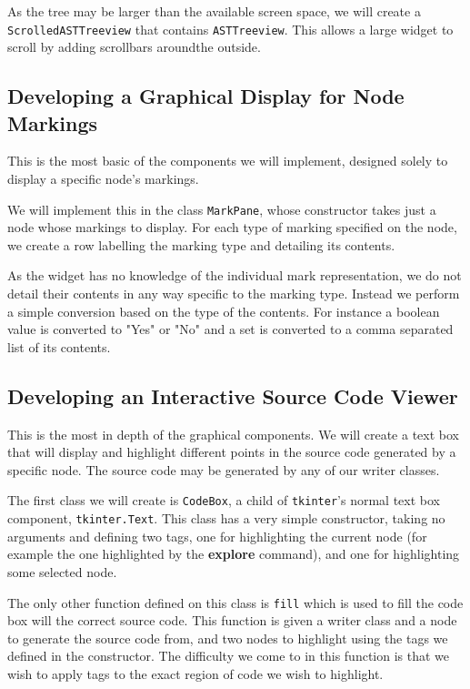 \documentclass[twoside,a4paper]{report}
\begin{document}
As the tree may be larger than the available screen space, we will create a \texttt{ScrolledASTTreeview} that contains \texttt{ASTTreeview}. This allows a
large widget to scroll by adding scrollbars aroundthe outside.

\subsection{Developing a Graphical Display for Node Markings}

This is the most basic of the components we will implement, designed solely to display a specific node's markings.

We will implement this in the class \texttt{MarkPane}, whose constructor takes just a node whose markings to display. For each type of marking specified on the
node, we create a row labelling the marking type and detailing its contents.

As the widget has no knowledge of the individual mark representation, we do not detail their contents in any way specific to the marking type. Instead we perform
a simple conversion based on the type of the contents. For instance a boolean value is converted to "Yes" or "No" and a set is converted to a comma separated
list of its contents.

\subsection{Developing an Interactive Source Code Viewer}

This is the most in depth of the graphical components. We will create a text box that will display and highlight different points in the source code generated
by a specific node. The source code may be generated by any of our writer classes.

The first class we will create is \texttt{CodeBox}, a child of \texttt{tkinter}'s normal text box component, \texttt{tkinter.Text}. This class has a very
simple constructor, taking no arguments and defining two tags, one for highlighting the current node (for example the one highlighted by the
\textbf{explore} command), and one for highlighting some selected node.

The only other function defined on this class is \texttt{fill} which is used to fill the code box will the correct source code. This function is given a
writer class and a node to generate the source code from, and two nodes to highlight using the tags we defined in the constructor. The difficulty we come to
in this function is that we wish to apply tags to the exact region of code we wish to highlight.
\end{document}
